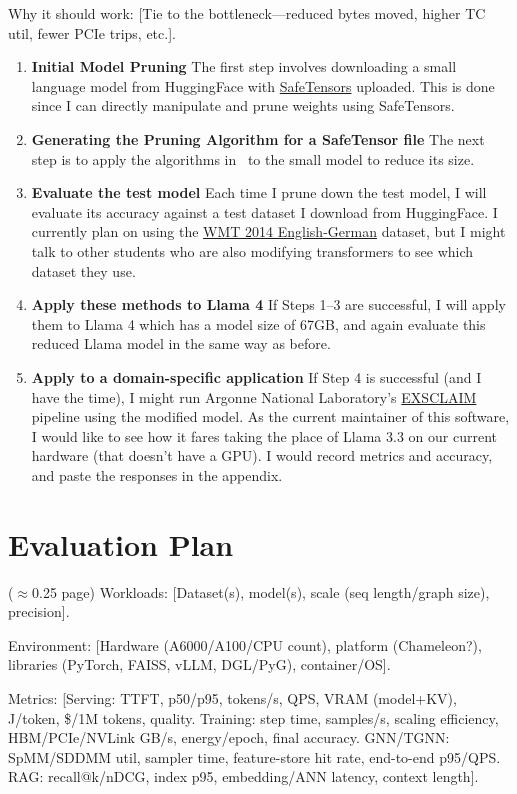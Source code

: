 \documentclass[
	title={Project Proposal}
]{cs595project}
\begin{document}
Why it should work: [Tie to the bottleneck—reduced bytes moved, higher TC util, fewer PCIe trips, etc.].
\fi
\begin{enumerate}
	\item \textbf{Initial Model Pruning} The first step involves downloading a small language model from HuggingFace with \href{https://huggingface.co/docs/safetensors/en/index}{SafeTensors} uploaded.
	This is done since I can directly manipulate and prune weights using SafeTensors.
	\item \textbf{Generating the Pruning Algorithm for a SafeTensor file} The next step is to apply the algorithms in~\cite{Lottery-Ticket-Hypothesis,LTH-Transformer} to the small model to reduce its size.
	\item \textbf{Evaluate the test model} Each time I prune down the test model, I will evaluate its accuracy against a test dataset I download from HuggingFace. I currently plan on using the \href{https://www.kaggle.com/datasets/mohamedlotfy50/wmt-2014-english-german}{WMT 2014 English-German} dataset, but I might talk to other students who are also modifying transformers to see which dataset they use.
	\item \textbf{Apply these methods to Llama 4} If Steps 1--3 are successful, I will apply them to Llama 4 which has a model size of 67GB, and again evaluate this reduced Llama model in the same way as before.
	\item \textbf{Apply to a domain-specific application} If Step 4 is successful (and I have the time), I might run Argonne National Laboratory's \href{https://exsclaim.materialeyes.org}{EXSCLAIM} pipeline using the modified model. As the current maintainer of this software, I would like to see how it fares taking the place of Llama 3.3 on our current hardware (that doesn't have a GPU).
	I would record metrics and accuracy, and paste the responses in the appendix.
\end{enumerate}

\section{Evaluation Plan}\label{sec:evaluation-plan}
\ifdetails
($\approx$0.25 page)
Workloads: [Dataset(s), model(s), scale (seq length/graph size), precision].

Environment: [Hardware (A6000/A100/CPU count), platform (Chameleon?), libraries (PyTorch, FAISS, vLLM, DGL/PyG), container/OS].

Metrics: [Serving: TTFT, p50/p95, tokens/s, QPS, VRAM (model+KV), J/token, \$/1M tokens, quality. Training: step time, samples/s, scaling efficiency, HBM/PCIe/NVLink GB/s, energy/epoch, final accuracy. GNN/TGNN: SpMM/SDDMM util, sampler time, feature-store hit rate, end-to-end p95/QPS. RAG: recall@k/nDCG, index p95, embedding/ANN latency, context length].
\end{document}
